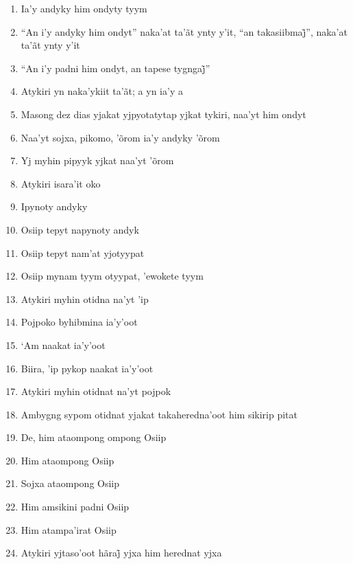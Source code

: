 \begin{enumerate}
 \begin{center}\end{center}
 
 \item Ia'y andyky him ondyty tyym
 \item ``An i’y andyky him ondyt'' naka’at ta’ãt ynty y’it, ``an takasiibmaj̃'', naka’at ta’ãt ynty y’it
 \item ``An i’y padni him ondyt, an tapese tygngaj̃''
 \item Atykiri yn naka'ykiit ta'ãt; a yn ia'y a
 \item Masong dez dias yjakat yjpyotatytap yjkat tykiri, naa'yt him ondyt
 \item Naa'yt sojxa, pikomo, 'õrom ia'y andyky 'õrom
 \item Yj myhin pipyyk yjkat naa'yt 'õrom
 \item Atykiri isara'it oko
 
 \begin{center}\end{center}
 
 \item Ipynoty andyky
 \item Osiip tepyt napynoty andyk
 \item Osiip tepyt nam'at yjotyypat
 \item Osiip mynam tyym otyypat, 'ewokete tyym
 
 \begin{center}\end{center}
 
 \item Atykiri myhin otidna na'yt 'ip
 \item Pojpoko byhibmina ia'y'oot
 \item `Am naakat ia'y'oot
 \item Biira, 'ip pykop naakat ia'y'oot
 \item Atykiri myhin otidnat na'yt pojpok
 
 \begin{center}\end{center}
 
 \item Ambygng sypom otidnat yjakat takaheredna'oot him sikirip pitat
 \item De, him ataompong ompong Osiip
 \item Him ataompong Osiip
 \item Sojxa ataompong Osiip
 \item Him amsikini padni Osiip
 \item Him atampa'irat Osiip
 \item Atykiri yjtaso’oot hãraj̃ yjxa him herednat yjxa
 

\end{enumerate}
